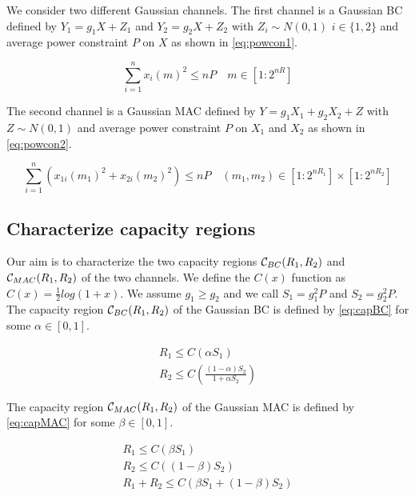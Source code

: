 
We consider two different Gaussian channels. The first channel is a Gaussian BC defined by $Y_1 = g_1 X + Z_1$  and $Y_2 = g_2 X + Z_2$ with $Z_i \sim N(0,1)$ $i \in \{1,2\}$ and average power constraint $P$ on $X$ as shown in \eqref{eq:powcon1}.

\begin{equation}
	\sum_{i=1}^n x_i(m)^2 \leq nP \quad m \in [1:2^{nR}]
	\label{eq:powcon1}
\end{equation}

The second channel is a Gaussian MAC defined by $Y = g_1 X_1 + g_2 X_2 + Z$ with $Z \sim N(0,1)$ and average power constraint $P$ on $X_1$ and $X_2$ as shown in \eqref{eq:powcon2}.

\begin{equation}
	\sum_{i=1}^n \left( x_{1i}(m_1)^2 + x_{2i}(m_2)^2 \right) \leq nP \quad (m_1,m_2) \in [1:2^{nR_1}] \times [1:2^{nR_2}]
	\label{eq:powcon2}
\end{equation}

\subsection{Characterize capacity regions}

Our aim is to characterize the two capacity regions $\mathcal{C}_{BC}(R_1, R_2)$ and $\mathcal{C}_{MAC}(R_1, R_2)$ of the two channels. We define the $C(x)$ function as $C(x)=\frac{1}{2}log(1+x)$. We assume $g_1 \geq g_2$ and we call $S_1=g_1^2P$ and $S_2=g_2^2P$. The capacity region $\mathcal{C}_{BC}(R_1, R_2)$ of the Gaussian BC is defined by \eqref{eq:capBC} for some $\alpha \in [0,1]$.

\begin{equation}
	\begin{gathered}
		R_1 \leq C(\alpha S_1) \\
		R_2 \leq C\left(\frac{(1-\alpha)S_2}{1+\alpha S_2}\right)
	\end{gathered}
	\label{eq:capBC}
\end{equation}

The capacity region $\mathcal{C}_{MAC}(R_1, R_2)$ of the Gaussian MAC is defined by \eqref{eq:capMAC} for some $\beta \in [0,1]$.

\begin{equation}
	\begin{gathered}
		R_1 \leq C(\beta S_1) \\
		R_2 \leq C((1-\beta) S_2) \\
		R_1 + R_2 \leq C(\beta S_1 + (1-\beta)S_2)
	\end{gathered}
	\label{eq:capMAC}
\end{equation}

